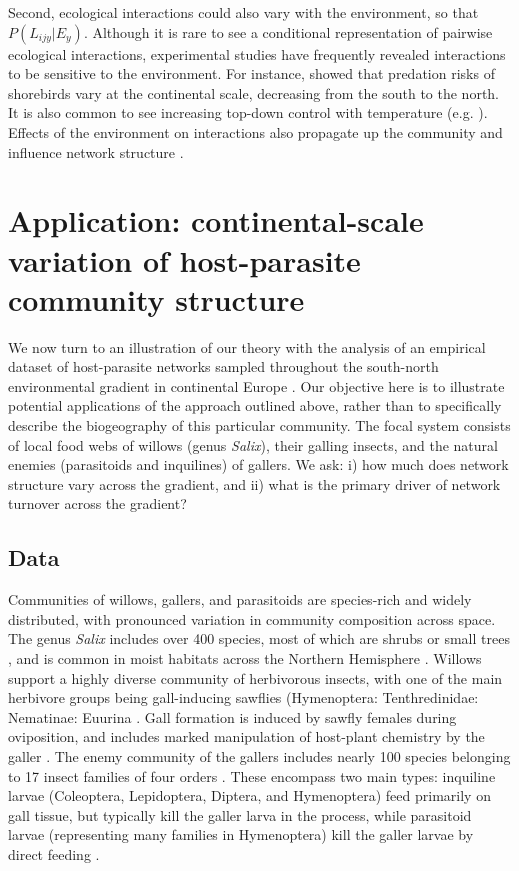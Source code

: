 \documentclass[12pt]{article}
\begin{document}
Second, ecological interactions could also vary with the environment, so that
$P(L_{ijy}|E_y)$. Although it is rare to see a conditional representation of
pairwise ecological interactions, experimental studies have frequently
revealed interactions to be sensitive to the environment. For instance,
\citet{Mckinnon2010} showed that predation risks of shorebirds vary at the
continental scale, decreasing from the south to the north. It is also common
to see increasing top-down control with temperature (e.g. \citealt{Shurin2012,
Gray2016}). Effects of the environment on interactions \citep{Gibert2014} also
propagate up the community and influence network structure
\citep{Tylianakis2007, Woodward2010, Petchey2010a}.


\section*{Application: continental-scale variation of host-parasite community structure}

We now turn to an illustration of our theory with the analysis of an empirical
dataset of host-parasite networks sampled throughout the south-north
environmental gradient in continental Europe \citep{Kopelke2017}. Our
objective here is to illustrate potential applications of the approach
outlined above, rather than to specifically describe the biogeography
of this particular community. The focal system consists of local food webs of
willows (genus \textit{Salix}), their galling insects, and the natural enemies
(parasitoids and inquilines) of gallers. We ask:
i) how much does network structure vary across the gradient, and ii) what is
the primary driver of network turnover across the gradient?

\subsection*{Data}

Communities of willows, gallers, and parasitoids are species-rich and widely
distributed, with pronounced variation in community composition across space.
The genus \textit{Salix} includes over 400 species, most of which are shrubs
or small trees \citep{Argus1997}, and is common in moist habitats across the
Northern Hemisphere \citep{Skvortsov1999}. Willows support a highly diverse
community of herbivorous insects, with one of the main herbivore groups being
gall-inducing sawflies (Hymenoptera: Tenthredinidae: Nematinae: Euurina
\citep{Kopelke1999}. Gall formation is induced by sawfly females during
oviposition, and includes marked manipulation of host-plant chemistry by the
galler \citep{Nyman2000}. The enemy community of the gallers includes nearly
100 species belonging to 17 insect families of four orders
\citep{Kopelke2003}. These encompass two main types: inquiline larvae
(Coleoptera, Lepidoptera, Diptera, and Hymenoptera) feed primarily on gall
tissue, but typically kill the galler larva in the process, while parasitoid
larvae (representing many families in Hymenoptera) kill the galler larvae by
direct feeding \citep{Kopelke2003}. 
\end{document}
